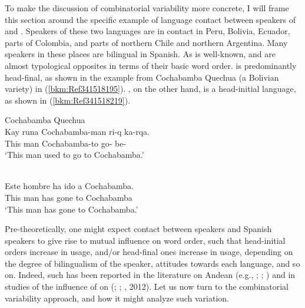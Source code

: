 \documentclass[output=paper]{langsci/langscibook}
\begin{document}
To make the discussion of combinatorial variability more concrete, I will frame
this section around the specific example of language contact between speakers
of  and .  Speakers of these two languages are in contact in
Peru, Bolivia, Ecuador, parts of Colombia, and parts of northern Chile and
northern Argentina. Many  speakers in these places are bilingual in
Spanish.  As is well-known,  and  are almost typological
opposites in terms of their basic word order.  is predominantly
head-final, as shown in the example from Cochabamba Quechua (a Bolivian
variety) in (\ref{bkm:Ref341518195}).  , on the other hand, is a
head-initial language, as shown in (\ref{bkm:Ref341518219}).\largerpage

\ea\label{bkm:Ref341518195}Cochabamba Quechua\\
    \gll Kay  runa  Cochabamba-man  ri-q ka-rqa.\\
            This man Cochabamba-to go-\Nmlz{} be-\Pst{}\\
    \glt    \enquote*{This man used to go to Cochabamba.}
\z

\ea\label{bkm:Ref341518219}\\
    \gll Este hombre ha ido a Cochabamba.\\
            This  man      has   gone    to  Cochabamba\\
    \glt    \enquote*{This man has gone to Cochabamba.}
\z

Pre-theoretically, one might expect contact between  speakers and
Spanish speakers to give rise to mutual influence on word order, such that
head-initial orders increase in  usage, and/or head-final ones increase
in  usage, depending on the degree of bilingualism of the speaker,
attitudes towards each language, and so on.  Indeed, such has been reported in
the literature on Andean  (e.g., \citealt{Muntendam2008};
\citealt{Muysken1984}; \citealt{Sanchez2003}) and in studies of the influence
of  on  (\citealt{Camacho1999}; \citealt{Hintz2009};
\citealt{Sanchez2003}, 2012).  Let us now turn to the combinatorial variability
approach, and how it might analyze such variation.
\end{document}
